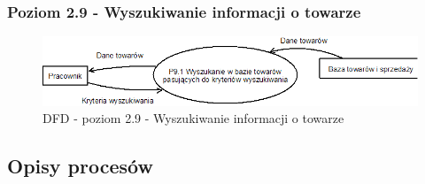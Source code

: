 \subsubsection{Poziom 2.9 - Wyszukiwanie informacji o towarze}
\begin{figure}[h]
\includegraphics[width=1\textwidth]{gfx/dfd-2-9.png}
\caption{DFD - poziom 2.9 - Wyszukiwanie informacji o towarze}
\end{figure}
\clearpage
\subsection{Opisy procesów}
